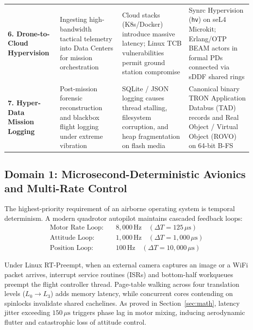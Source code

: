 \documentclass[10pt,journal,compsoc,twocolumn]{article}
\begin{document}
\begin{table}[t]
\begin{tabularx}{\textwidth}{@{} >{\raggedright\arraybackslash\bfseries}p{2.5cm} >{\raggedright\arraybackslash}p{3.8cm} >{\raggedright\arraybackslash}p{4.0cm} >{\raggedright\arraybackslash}X @{}}
6. Drone-to-Cloud Hypervision & Ingesting high-bandwidth tactical telemetry into Data Centers for mission orchestration & Cloud stacks (K8s/Docker) introduce massive latency; Linux TCB vulnerabilities permit ground station compromise & Synrc Hypervision (\texttt{hv}) on seL4 Microkit; Erlang/OTP BEAM actors in formal PDs connected via sDDF shared rings \\
7. Hyper-Data Mission Logging & Post-mission forensic reconstruction and blackbox flight logging under extreme vibration & SQLite / JSON logging causes thread stalling, filesystem corruption, and heap fragmentation on flash media & Canonical binary TRON Application Databus (TAD) records and Real Object / Virtual Object (ROVO) on 64-bit B-FS \\
\bottomrule
\end{tabularx}
\end{table}

\subsection{Domain 1: Microsecond-Deterministic Avionics and Multi-Rate Control}
The highest-priority requirement of an airborne operating system is temporal determinism. A modern quadrotor autopilot maintains cascaded feedback loops:
\begin{equation}
\label{eq:control_loops}
\begin{aligned}
\text{Motor Rate Loop:} &\quad 8{,}000\,\text{Hz} \quad (\Delta T = 125\,\mu\text{s}) \\
\text{Attitude Loop:}   &\quad 1{,}000\,\text{Hz} \quad (\Delta T = 1{,}000\,\mu\text{s}) \\
\text{Position Loop:}   &\quad 100\,\text{Hz}   \quad (\Delta T = 10{,}000\,\mu\text{s})
\end{aligned}
\end{equation}

Under Linux RT-Preempt, when an external camera captures an image or a WiFi packet arrives, interrupt service routines (ISRs) and bottom-half workqueues preempt the flight controller thread. Page-table walking across four translation levels ($L_0 \to L_3$) adds memory latency, while concurrent cores contending on spinlocks invalidate shared cachelines. As proved in Section~\ref{sec:math}, latency jitter exceeding $150\,\mu\text{s}$ triggers phase lag in motor mixing, inducing aerodynamic flutter and catastrophic loss of attitude control.
\end{document}

